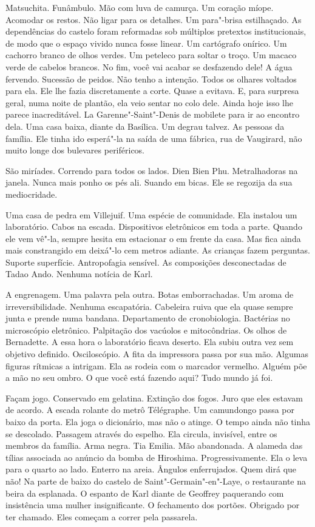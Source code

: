 Matsuchita. Funâmbulo. Mão com luva de camurça. Um coração míope.
Acomodar os restos. Não ligar para os detalhes. Um para"-brisa
estilhaçado. As dependências do castelo foram reformadas sob múltiplos
pretextos institucionais, de modo que o espaço vivido nunca fosse
linear. Um cartógrafo onírico. Um cachorro branco de olhos verdes. Um
peteleco para soltar o troço. Um macaco verde de cabelos brancos. No
fim, você vai acabar se desfazendo dele! A água fervendo. Sucessão de
peidos. Não tenho a intenção. Todos os olhares voltados para ela. Ele
lhe fazia discretamente a corte. Quase a evitava. E, para surpresa
geral, numa noite de plantão, ela veio sentar no colo dele. Ainda hoje
isso lhe parece inacreditável. La Garenne"-Saint"-Denis de mobilete para
ir ao encontro dela. Uma casa baixa, diante da Basílica. Um degrau
talvez. As pessoas da família. Ele tinha ido esperá"-la na saída de uma
fábrica, rua de Vaugirard, não muito longe dos bulevares periféricos.

São miríades. Correndo para todos os lados. Dien Bien Phu. Metralhadoras
na janela. Nunca mais ponho os pés ali. Suando em bicas. Ele se regozija
da sua mediocridade.

Uma casa de pedra em Villejuif. Uma espécie de comunidade. Ela instalou
um laboratório. Cabos na escada. Dispositivos eletrônicos em toda a
parte. Quando ele vem vê"-la, sempre hesita em estacionar o  em frente
da casa. Mas fica ainda mais constrangido em deixá"-lo cem metros
adiante. As crianças fazem perguntas. Suporte superfície. Antropofagia
sensível. As composições desconectadas de Tadao Ando. Nenhuma notícia de
Karl.

A engrenagem. Uma palavra pela outra. Botas emborrachadas. Um aroma de
irreversibilidade. Nenhuma escapatória. Cabeleira ruiva que ela quase
sempre junta e prende numa bandana. Departamento de cronobiologia.
Bactérias no microscópio eletrônico. Palpitação dos vacúolos e
mitocôndrias. Os olhos de Bernadette. A essa hora o laboratório ficava
deserto. Ela subiu outra vez sem objetivo definido. Osciloscópio. A fita
da impressora passa por sua mão. Algumas figuras rítmicas a intrigam.
Ela as rodeia com o marcador vermelho. Alguém põe a mão no seu ombro. O
que você está fazendo aqui? Tudo mundo já foi. %

Façam jogo. Conservado em gelatina. Extinção dos fogos. Juro que eles
estavam de acordo. A escada rolante do metrô Télégraphe. Um camundongo
passa por baixo da porta. Ela joga o dicionário, mas não o atinge. O
tempo ainda não tinha se descolado. Passagem através do espelho. Ela
circula, invisível, entre os membros da família. Arma negra. Tia Emilia.
Mão abandonada. A alameda das tílias associada ao anúncio da bomba de
Hiroshima. Progressivamente. Ela o leva para o quarto ao lado. Enterro
na areia. Ângulos enferrujados. Quem dirá que não! Na parte de baixo do
castelo de Saint"-Germain"-en"-Laye, o restaurante na beira da esplanada. O
espanto de Karl diante de Geoffrey paquerando com insistência uma mulher
insignificante. O fechamento dos portões. Obrigado por ter chamado. Eles
começam a correr pela passarela.

